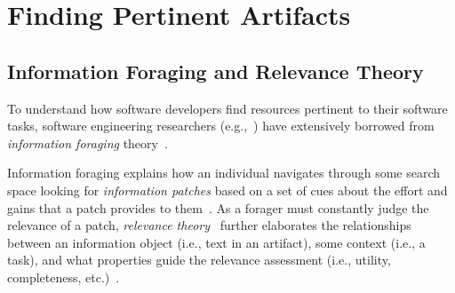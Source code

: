 \section{Finding Pertinent Artifacts}
\label{cp2:foraging-tools}












\subsection{Information Foraging and Relevance Theory}

To understand how software developers find  resources
pertinent to their software tasks,
software engineering researchers (e.g.,~\cite{Piorkowski2015, Piorkowski2016, chi2007, Xia2017}) have extensively borrowed from \textit{information foraging} theory~\cite{Pirolli1999}.


Information foraging explains how 
an individual navigates through some search space looking for \textit{information patches} based on 
a set of cues about the effort and gains that a patch provides to them~\cite{Pirolli1999}.
As a forager must constantly judge
the relevance of a patch, \textit{relevance theory}~\cite{clark2013relevance, saracevic1975} further elaborates the relationships between an information object (i.e., text in an artifact),
some context (i.e., a task), and what properties guide the relevance assessment (i.e., utility, completeness, etc.)~\cite{Saracevic2007c}.












